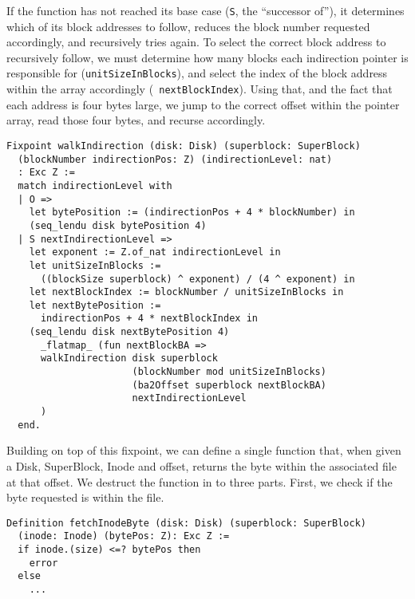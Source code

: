 \documentclass[nocopyrightspace]{sigplanconf}
\begin{document}
If the function has not reached its base case ({\tt S}, the ``successor of''),
it determines which of its block addresses to follow, reduces the block number
requested accordingly, and recursively tries again. To select the correct
block address to recursively follow, we must determine how many blocks each
indirection pointer is responsible for ({\tt unitSizeInBlocks}), and select
the index of the block address within the array accordingly ({\tt
nextBlockIndex}). Using that, and the fact that each address is four bytes
large, we jump to the correct offset within the pointer array, read those four
bytes, and recurse accordingly.

\begin{lstlisting}
Fixpoint walkIndirection (disk: Disk) (superblock: SuperBlock)
  (blockNumber indirectionPos: Z) (indirectionLevel: nat) 
  : Exc Z :=
  match indirectionLevel with
  | O => 
    let bytePosition := (indirectionPos + 4 * blockNumber) in
    (seq_lendu disk bytePosition 4)
  | S nextIndirectionLevel =>
    let exponent := Z.of_nat indirectionLevel in
    let unitSizeInBlocks := 
      ((blockSize superblock) ^ exponent) / (4 ^ exponent) in
    let nextBlockIndex := blockNumber / unitSizeInBlocks in
    let nextBytePosition := 
      indirectionPos + 4 * nextBlockIndex in
    (seq_lendu disk nextBytePosition 4) 
      _flatmap_ (fun nextBlockBA =>
      walkIndirection disk superblock 
                      (blockNumber mod unitSizeInBlocks)
                      (ba2Offset superblock nextBlockBA)
                      nextIndirectionLevel
      )
  end.
\end{lstlisting}

Building on top of this fixpoint, we can define a single function that, when
given a Disk, SuperBlock, Inode and offset, returns the byte within the
associated file at that offset. We destruct the function in to three parts.
First, we check if the byte requested is within the file.

\begin{lstlisting}
Definition fetchInodeByte (disk: Disk) (superblock: SuperBlock)
  (inode: Inode) (bytePos: Z): Exc Z :=
  if inode.(size) <=? bytePos then 
    error
  else 
    ...
\end{lstlisting}
\end{document}
